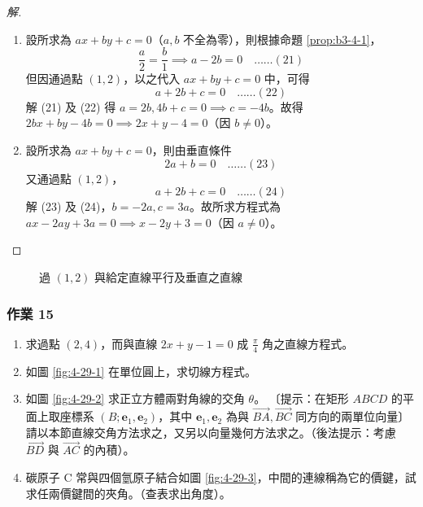 \begin{proof}[解]
\begin{enumerate}[label=(\roman*), leftmargin=2em]
  \item 設所求為 $ax + by + c = 0$（$a, b$ 不全為零），則根據命題 \ref{prop:b3-4-1}，
  \[ \frac{a}{2} = \frac{b}{1} \implies a - 2b = 0 \quad\dots\dots (21) \]
  但因通過點 $(1, 2)$，以之代入 $ax + by + c = 0$ 中，可得
  \[ a + 2b + c = 0 \quad\dots\dots (22) \]
  解 (21) 及 (22) 得 $a = 2b, 4b + c = 0 \implies c = -4b$。故得 $2bx + by - 4b = 0 \implies 2x + y - 4 = 0$（因 $b \neq 0$）。
  
  \item 設所求為 $ax + by + c = 0$，則由垂直條件
  \[ 2a + b = 0 \quad\dots\dots (23) \]
  又通過點 $(1, 2)$，
  \[ a + 2b + c = 0 \quad\dots\dots (24) \]
  解 (23) 及 (24)，$b = -2a, c = 3a$。故所求方程式為 $ax - 2ay + 3a = 0 \implies x - 2y + 3 = 0$（因 $a \neq 0$）。
\end{enumerate}
\end{proof}

\begin{figure}[H]
\centering
{}
\caption{過 $(1,2)$ 與給定直線平行及垂直之直線}
\label{fig:4-28}
\end{figure}

\subsubsection*{作業 15}
\begin{enumerate}[label=(\roman*), leftmargin=2em]
  \item 求過點 $(2, 4)$，而與直線 $2x + y - 1 = 0$ 成 $\frac{\pi}{4}$ 角之直線方程式。
  \item 如圖 \ref{fig:4-29-1} 在單位圓上，求切線方程式。
  \item 如圖 \ref{fig:4-29-2} 求正立方體兩對角線的交角 $\theta$。
  〔提示：在矩形 $ABCD$ 的平面上取座標系 $(B; \mathbf{e}_1, \mathbf{e}_2)$，其中 $\mathbf{e}_1, \mathbf{e}_2$ 為與 $\vec{BA}, \vec{BC}$ 同方向的兩單位向量〕請以本節直線交角方法求之，又另以向量幾何方法求之。（後法提示：考慮 $\vec{BD}$ 與 $\vec{AC}$ 的內積）。
  \item 碳原子 C 常與四個氫原子結合如圖 \ref{fig:4-29-3}，中間的連線稱為它的價鍵，試求任兩價鍵間的夾角。（查表求出角度）。
\end{enumerate}

